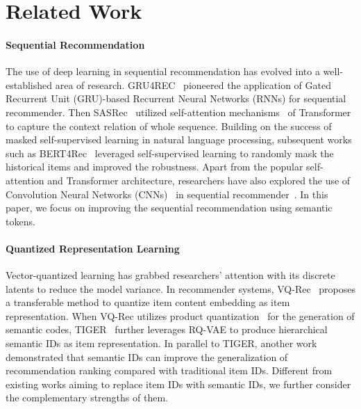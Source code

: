 \section{Related Work}
\paragraph{\textbf{Sequential Recommendation}} The use of deep learning in sequential recommendation has evolved into a well-established area of research. GRU4REC~\citep{gru4rec} pioneered the application of Gated Recurrent Unit (GRU)-based Recurrent Neural Networks (RNNs) for sequential recommender. Then SASRec~\citep{sasrec} utilized self-attention mechanisms~\cite{vaswani2017attention} of Transformer to capture the context relation of whole sequence. Building on the success of masked self-supervised learning in natural language processing, subsequent works such as BERT4Rec~\citep{bert4rec} leveraged self-supervised learning to randomly mask the historical items and improved the robustness. Apart from the popular self-attention and Transformer architecture, researchers have also explored the use of Convolution Neural Networks (CNNs)~\citep{CNN} in sequential recommender~\citep{caser}. In this paper, we focus on improving the sequential recommendation using semantic tokens.

\paragraph{\textbf{Quantized Representation Learning}} Vector-quantized learning has grabbed researchers' attention with its discrete latents to reduce the model variance. In recommender systems, VQ-Rec~\citep{vqrec} proposes a transferable method to quantize item content embedding as item representation. When VQ-Rec utilizes product quantization~\citep{jegou2010product} for the generation of semantic codes, TIGER~\citep{rajput2024recommender} further leverages RQ-VAE to produce hierarchical semantic IDs as item representation. In parallel to TIGER, another work~\citep{singh2023better} demonstrated that semantic IDs can improve the generalization of recommendation ranking compared with traditional item IDs. Different from existing works aiming to replace item IDs with semantic IDs, we further consider the complementary strengths of them.